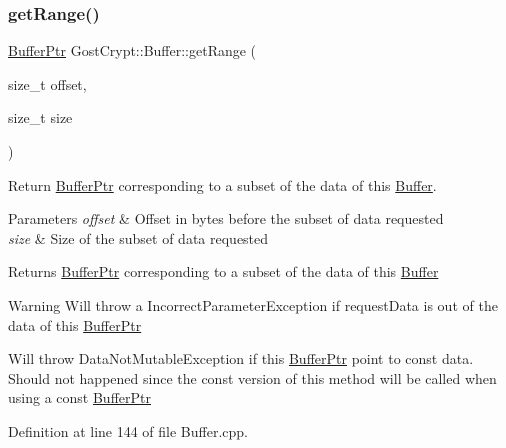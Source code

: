 \subsubsection{\texorpdfstring{get\+Range()}{getRange()}\hspace{0.1cm}{\footnotesize\ttfamily [1/2]}}
{\footnotesize\ttfamily \hyperlink{class_gost_crypt_1_1_buffer_ptr}{Buffer\+Ptr} Gost\+Crypt\+::\+Buffer\+::get\+Range (\begin{DoxyParamCaption}\item[{size\+\_\+t}]{offset,  }\item[{size\+\_\+t}]{size }\end{DoxyParamCaption})\hspace{0.3cm}{\ttfamily [virtual]}}



Return \hyperlink{class_gost_crypt_1_1_buffer_ptr}{Buffer\+Ptr} corresponding to a subset of the data of this \hyperlink{class_gost_crypt_1_1_buffer}{Buffer}. 


\begin{DoxyParams}{Parameters}
{\em offset} & Offset in bytes before the subset of data requested \\
\hline
{\em size} & Size of the subset of data requested \\
\hline
\end{DoxyParams}
\begin{DoxyReturn}{Returns}
\hyperlink{class_gost_crypt_1_1_buffer_ptr}{Buffer\+Ptr} corresponding to a subset of the data of this \hyperlink{class_gost_crypt_1_1_buffer}{Buffer} 
\end{DoxyReturn}
\begin{DoxyWarning}{Warning}
Will throw a Incorrect\+Parameter\+Exception if request\+Data is out of the data of this \hyperlink{class_gost_crypt_1_1_buffer_ptr}{Buffer\+Ptr} 

Will throw Data\+Not\+Mutable\+Exception if this \hyperlink{class_gost_crypt_1_1_buffer_ptr}{Buffer\+Ptr} point to const data. Should not happened since the const version of this method will be called when using a const \hyperlink{class_gost_crypt_1_1_buffer_ptr}{Buffer\+Ptr} 
\end{DoxyWarning}


Definition at line 144 of file Buffer.\+cpp.

\mbox{\label{class_gost_crypt_1_1_buffer_afd2d566e10c24d5fa8f8fc28ea31a189}} 
